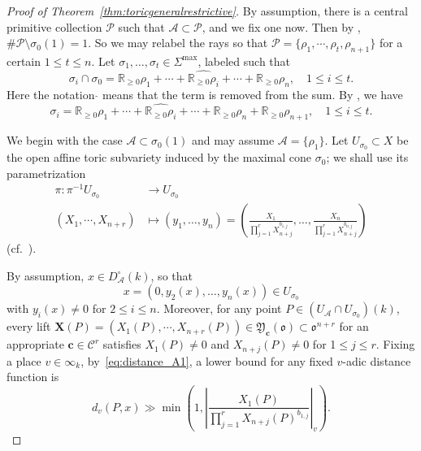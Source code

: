 \documentclass[a4paper, twoside, 11pt]{amsart}
\theoremstyle{definition}
\newcommand{\cA}{\mathcal{A}}
\newcommand{\cC}{\mathcal{C}}
\newcommand{\cP}{\mathcal{P}}
\newcommand{\bc}{\boldsymbol{c}}
\newcommand{\bX}{{\boldsymbol{X}}}
\newcommand{\mY}{\mathfrak{Y}}
\newcommand{\fo}{\mathfrak{o}}
\newcommand{\RR}{\mathbb{R}}
\begin{document}
\begin{proof}[Proof of Theorem~\ref{thm:toricgeneralrestrictive}]
        By assumption, there is a central primitive collection $\cP$ such that $\cA\subset\cP$, and we fix one now. Then by \cite[Lem.~6.6]{HuangANT}, $\#\cP\setminus\sigma_0(1)=1$. So we may relabel the rays so that $\cP=\{\rho_1,\cdots,\rho_{t},\rho_{n+1}\}$ for a certain $1\leq t\leq n$. Let  $\sigma_1,\dots,\sigma_t\in\Sigma^{\max}$, labeled such that
	\begin{equation*}
		\sigma_{i}\cap \sigma_0
		= \RR_{\geq 0}\rho_1+\cdots +
			\widehat{\RR_{\geq 0}\rho_{i}}+\cdots+\RR_{\geq 0} \rho_n,\quad 1\leq i\leq t.
	\end{equation*} Here the notation $\widehat{}$ means that the term is removed from the sum.
By \cite[Lem.~6.6]{HuangANT}, we have
\begin{equation}\label{eq:sigmai}
    \sigma_{i}=\RR_{\geq 0}\rho_1+\cdots +
\widehat{\RR_{\geq 0}\rho_{i}}+\cdots+\RR_{\geq 0} \rho_n+\RR_{\geq 0} \rho_{n+1},\quad 1\leq i\leq t.
\end{equation}
        
We begin with the case $\cA\subset \sigma_0(1)$ and may assume $\cA=\{\rho_1\}$. 
Let $U_{\sigma_0}\subset X$ be the open affine toric subvariety induced by the maximal cone $\sigma_0$; we shall use its parametrization
	\begin{equation}\label{eq:parahyp}
		\begin{split}
			\pi\colon \pi^{-1}U_{\sigma_0}&\longrightarrow U_{\sigma_0}\\
			(X_1,\cdots,X_{n+r})&\longmapsto(y_1,\dots,y_n)= \left(\frac{X_1}{\prod_{j=1}^r
				X_{n+j}^{b_{1,j}}},\dots,\frac{X_n}{\prod_{j=1}^r
				X_{n+j}^{b_{n,j}}}\right)
		\end{split}
	\end{equation}
(cf.~\cite[\S\,6B1]{HuangANT}).


 By assumption, $x\in D_{\cA}^{\circ}(k)$, so that
\begin{equation*}
	x=(0,y_2(x),\dots,y_n(x))\in U_{\sigma_0}
\end{equation*}
with $y_i(x)\neq 0$ for $2\leq i\leq n$. Moreover, 
for any point $P\in (U_{\cA}\cap U_{\sigma_0})(k)$, every lift $\bX(P)=(X_1(P),\cdots,X_{n+r}(P))\in \mY_{\bc}(\fo)\subset\fo^{n+r}$ for an appropriate $\bc\in\cC^r$ satisfies $X_1(P)\neq 0$ and $X_{n+j}(P)\neq 0$ for 1$\leq j\leq r$. Fixing a place $v\in\infty_k$,
by~\eqref{eq:distance_A1}, a lower bound for any fixed $v$-adic distance function is
	\begin{equation}\label{eq:dist}
		d_v(P,x)\gg \min\left(1,\left|\frac{X_1(P)}{\prod_{j=1}^{r}X_{n+j}(P)^{{b}_{1,j}}}\right|_v\right).
	\end{equation}


\end{proof}
\end{document}

